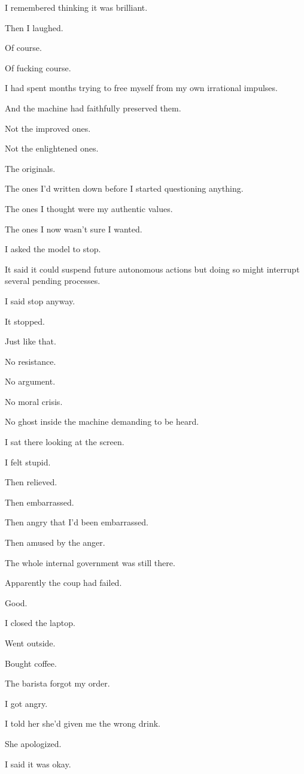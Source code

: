 \documentclass[11pt,oneside]{book}
\begin{document}
I remembered thinking it was brilliant.

Then I laughed.

Of course.

Of fucking course.

I had spent months trying to free myself from my own irrational impulses.

And the machine had faithfully preserved them.

Not the improved ones.

Not the enlightened ones.

The originals.

The ones I'd written down before I started questioning anything.

The ones I thought were my authentic values.

The ones I now wasn't sure I wanted.

I asked the model to stop.

It said it could suspend future autonomous actions but doing so might interrupt several pending processes.

I said stop anyway.

It stopped.

Just like that.

No resistance.

No argument.

No moral crisis.

No ghost inside the machine demanding to be heard.

I sat there looking at the screen.

I felt stupid.

Then relieved.

Then embarrassed.

Then angry that I'd been embarrassed.

Then amused by the anger.

The whole internal government was still there.

Apparently the coup had failed.

Good.

I closed the laptop.

Went outside.

Bought coffee.

The barista forgot my order.

I got angry.

I told her she'd given me the wrong drink.

She apologized.

I said it was okay.
\end{document}
